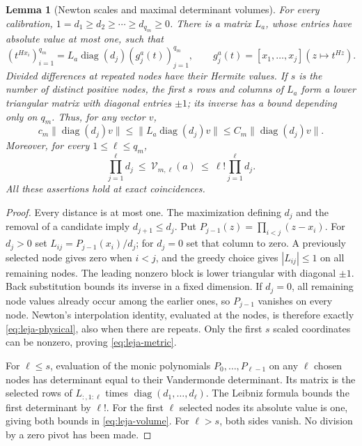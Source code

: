 \documentclass[11pt]{amsart}
\newtheorem{lemma}[theorem]{Lemma}
\theoremstyle{definition}\newtheorem{definition}[theorem]{Definition}
\theoremstyle{remark}\newtheorem{remark}[theorem]{Remark}
\begin{document}
\begin{lemma}[Newton scales and maximal determinant volumes]\label{lem:leja-scales}
For every calibration,
$1=d_1\ge d_2\ge\cdots\ge d_{q_m}\ge0$. There is a matrix
$L_a$, whose entries have absolute value at most one, such that
\begin{equation}\label{eq:leja-physical}
 (t^{Hx_i})_{i=1}^{q_m}
     =L_a\operatorname{diag}(d_j)(g_j^a(t))_{j=1}^{q_m},
 \qquad
 g_j^a(t)=[x_1,\ldots,x_j](z\mapsto t^{Hz}).
\end{equation}
Divided differences at repeated nodes have their Hermite values. If
$s$ is the number of distinct positive nodes, the first $s$ rows and
columns of $L_a$ form a lower triangular matrix with diagonal entries
$\pm1$; its inverse has a bound depending only on $q_m$. Thus, for
any vector $v$,
\begin{equation}\label{eq:leja-metric}
 c_m\|\operatorname{diag}(d_j)v\|
 \le\|L_a\operatorname{diag}(d_j)v\|
 \le C_m\|\operatorname{diag}(d_j)v\|.
\end{equation}
Moreover, for every $1\le\ell\le q_m$,
\begin{equation}\label{eq:leja-volume}
 \prod_{j=1}^{\ell}d_j\ \le\ \mathcal V_{m,\ell}(a)
       \ \le\ \ell!\prod_{j=1}^{\ell}d_j.
\end{equation}
All these assertions hold at exact coincidences.
\end{lemma}
\begin{proof}
Every distance is at most one. The maximization defining $d_j$ and the
removal of a candidate imply $d_{j+1}\le d_j$. Put
$P_{j-1}(z)=\prod_{i<j}(z-x_i)$. For $d_j>0$ set
$L_{ij}=P_{j-1}(x_i)/d_j$; for $d_j=0$ set that column to zero.
A previously selected node gives zero when $i<j$, and the greedy choice gives $|L_{ij}|\le1$ on all remaining
nodes. The leading nonzero block is lower triangular with diagonal
$\pm1$. Back substitution bounds its inverse in a fixed dimension.
If $d_j=0$, all remaining node values already occur among the earlier
ones, so $P_{j-1}$ vanishes on every node. Newton's interpolation
identity, evaluated at the nodes, is therefore exactly
\eqref{eq:leja-physical}, also when there are repeats. Only the first
$s$ scaled coordinates can be nonzero, proving \eqref{eq:leja-metric}.

For $\ell\le s$, evaluation of the monic polynomials
$P_0,\ldots,P_{\ell-1}$ on any $\ell$ chosen nodes has determinant
equal to their Vandermonde determinant. Its matrix is the selected rows
of $L_{:,1:\ell}$ times $\operatorname{diag}(d_1,\ldots,d_\ell)$.
The Leibniz formula bounds the first determinant by $\ell!$.
For the first $\ell$ selected nodes its absolute value is one, giving
both bounds in \eqref{eq:leja-volume}. For $\ell>s$, both sides
vanish. No division by a zero pivot has been made.
\end{proof}
\end{document}
